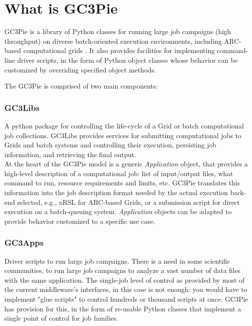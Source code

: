 \documentclass{PoS}
\begin{document}

\section{What is GC3Pie}
GC3Pie is a library of Python classes for running large job campaigns
(high throughput) on diverse batch-oriented execution environments,
including \acs{ARC}-based computational grids \cite{arc}.  It also
provides facilities for implementing command-line driver scripts, in
the form of Python object classes whose behavior can be customized by
overriding specified object methods.

The GC3Pie is comprised of two main components: 

\subsubsection*{GC3Libs}
 A python package for controlling the life-cycle of a Grid or batch
 computational job collections. GC3Libs provides services for
 submitting computational jobs to Grids and batch systems and
 controlling their execution, persisting job information, and
 retrieving the final output. \\


At the heart of the GC3Pie model is a generic \emph{Application}
object, that provides a high-level description of a computational
job: list of input/output files, what command to run, resource
requirements and limits, etc. GC3Pie translates this information into
the job description format needed by the actual execution back-end
selected, e.g., \acs{xRSL} for ARC-based Grids, or a submission script for
direct execution on a batch-queuing system. \emph{Application} objects
can be adapted to provide behavior customized to a specific use case.

\subsubsection*{GC3Apps}
Driver scripts to run large job campaigns. There is a need in some
scientific communities, to run large job
campaigns to analyze a vast number of data files with the same
application. The single-job level of control as provided by most of
the current middleware's interfaces, in this case is not
enough: you would have to implement "glue scripts" to control hundreds
or thousand scripts at once. GC3Pie has provision for this, in the
form of re-usable Python classes that implement a single point of
control for job families. \\
\end{document}
